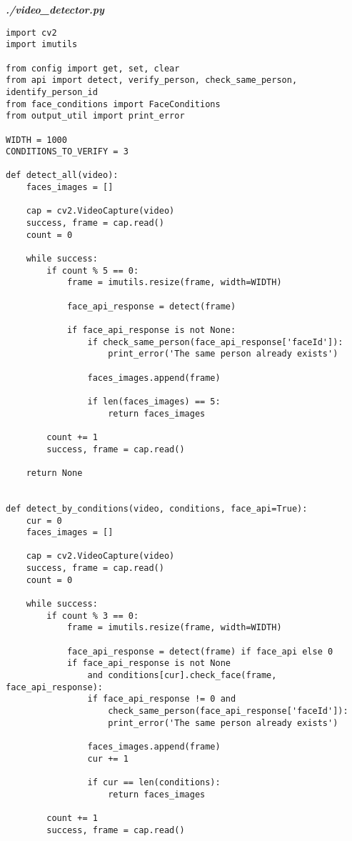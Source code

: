 \textit{\textbf{./video\_detector.py}}
\begin{verbatim}
import cv2
import imutils

from config import get, set, clear
from api import detect, verify_person, check_same_person, identify_person_id
from face_conditions import FaceConditions
from output_util import print_error

WIDTH = 1000
CONDITIONS_TO_VERIFY = 3

def detect_all(video):
    faces_images = []

    cap = cv2.VideoCapture(video)
    success, frame = cap.read()
    count = 0

    while success:
        if count % 5 == 0:
            frame = imutils.resize(frame, width=WIDTH)

            face_api_response = detect(frame)

            if face_api_response is not None:
                if check_same_person(face_api_response['faceId']):
                    print_error('The same person already exists')

                faces_images.append(frame)

                if len(faces_images) == 5:
                    return faces_images

        count += 1
        success, frame = cap.read()

    return None


def detect_by_conditions(video, conditions, face_api=True):
    cur = 0
    faces_images = []

    cap = cv2.VideoCapture(video)
    success, frame = cap.read()
    count = 0

    while success:
        if count % 3 == 0:
            frame = imutils.resize(frame, width=WIDTH)

            face_api_response = detect(frame) if face_api else 0
            if face_api_response is not None 
                and conditions[cur].check_face(frame, face_api_response):
                if face_api_response != 0 and 
                    check_same_person(face_api_response['faceId']):
                    print_error('The same person already exists')

                faces_images.append(frame)
                cur += 1

                if cur == len(conditions):
                    return faces_images

        count += 1
        success, frame = cap.read()


\end{verbatim}
